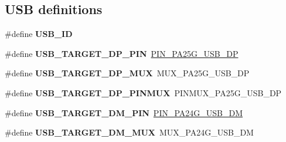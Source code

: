 \subsection*{U\+S\+B definitions}
\begin{DoxyCompactItemize}
\item 
\hypertarget{group__saml21__xplained__pro__features__group_gade1af4ebab8628311834baeea376350c}{}\#define {\bfseries U\+S\+B\+\_\+\+I\+D}\label{group__saml21__xplained__pro__features__group_gade1af4ebab8628311834baeea376350c}

\item 
\hypertarget{group__saml21__xplained__pro__features__group_gaac2fbb45d72d2ff1508ceacdb237d03f}{}\#define {\bfseries U\+S\+B\+\_\+\+T\+A\+R\+G\+E\+T\+\_\+\+D\+P\+\_\+\+P\+I\+N}~\hyperlink{pio_2saml21j18a_8h_ad3209fce355391fa37fb9ee091037c99}{P\+I\+N\+\_\+\+P\+A25\+G\+\_\+\+U\+S\+B\+\_\+\+D\+P}\label{group__saml21__xplained__pro__features__group_gaac2fbb45d72d2ff1508ceacdb237d03f}

\item 
\hypertarget{group__saml21__xplained__pro__features__group_ga1fe80f3fee58c45936740b202755d8b4}{}\#define {\bfseries U\+S\+B\+\_\+\+T\+A\+R\+G\+E\+T\+\_\+\+D\+P\+\_\+\+M\+U\+X}~M\+U\+X\+\_\+\+P\+A25\+G\+\_\+\+U\+S\+B\+\_\+\+D\+P\label{group__saml21__xplained__pro__features__group_ga1fe80f3fee58c45936740b202755d8b4}

\item 
\hypertarget{group__saml21__xplained__pro__features__group_ga290c6af6406b6e41ff022616537be3b5}{}\#define {\bfseries U\+S\+B\+\_\+\+T\+A\+R\+G\+E\+T\+\_\+\+D\+P\+\_\+\+P\+I\+N\+M\+U\+X}~P\+I\+N\+M\+U\+X\+\_\+\+P\+A25\+G\+\_\+\+U\+S\+B\+\_\+\+D\+P\label{group__saml21__xplained__pro__features__group_ga290c6af6406b6e41ff022616537be3b5}

\item 
\hypertarget{group__saml21__xplained__pro__features__group_ga875ea014cfd19a7a60e27dd9f5fa54d9}{}\#define {\bfseries U\+S\+B\+\_\+\+T\+A\+R\+G\+E\+T\+\_\+\+D\+M\+\_\+\+P\+I\+N}~\hyperlink{pio_2saml21j18a_8h_a402ed7e21f4453f9c95d6acd4627003c}{P\+I\+N\+\_\+\+P\+A24\+G\+\_\+\+U\+S\+B\+\_\+\+D\+M}\label{group__saml21__xplained__pro__features__group_ga875ea014cfd19a7a60e27dd9f5fa54d9}

\item 
\hypertarget{group__saml21__xplained__pro__features__group_ga5b51bfdd1df608201dde0215a32c7d85}{}\#define {\bfseries U\+S\+B\+\_\+\+T\+A\+R\+G\+E\+T\+\_\+\+D\+M\+\_\+\+M\+U\+X}~M\+U\+X\+\_\+\+P\+A24\+G\+\_\+\+U\+S\+B\+\_\+\+D\+M\label{group__saml21__xplained__pro__features__group_ga5b51bfdd1df608201dde0215a32c7d85}


\end{DoxyCompactItemize}
